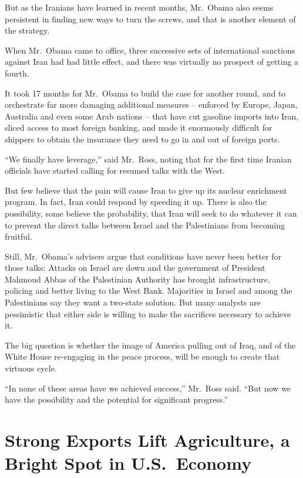 ﻿\documentclass[12pt]{article}
\begin{document}
But as the Iranians have learned in recent months, Mr.~Obama also seems persistent in finding new
ways to turn the screws, and that is another element of the strategy.

When Mr.~Obama came to office, three successive sets of international sanctions against Iran had had
little effect, and there was virtually no prospect of getting a fourth.

It took 17 months for Mr.~Obama to build the case for another round, and to orchestrate far more
damaging additional measures -- enforced by Europe, Japan, Australia and even some Arab nations --
that have cut gasoline imports into Iran, sliced access to most foreign banking, and made it
enormously difficult for shippers to obtain the insurance they need to go in and out of foreign
ports.

``We finally have leverage,'' said Mr.~Ross, noting that for the first time Iranian officials have
started calling for resumed talks with the West.

But few believe that the pain will cause Iran to give up its nuclear enrichment program. In fact,
Iran could respond by speeding it up. There is also the possibility, some believe the probability,
that Iran will seek to do whatever it can to prevent the direct talks between Israel and the
Palestinians from becoming fruitful.

Still, Mr.~Obama's advisers argue that conditions have never been better for those talks: Attacks on
Israel are down and the government of President Mahmoud Abbas of the Palestinian Authority has
brought infrastructure, policing and better living to the West Bank. Majorities in Israel and among
the Palestinians say they want a two-state solution. But many analysts are pessimistic that either
side is willing to make the sacrifices necessary to achieve it.

The big question is whether the image of America pulling out of Iraq, and of the White House
re-engaging in the peace process, will be enough to create that virtuous cycle.

``In none of these areas have we achieved success,'' Mr.~Ross said. ``But now we have the
possibility and the potential for significant progress.''

\pagebreak
\section{Strong Exports Lift Agriculture, a Bright Spot in U.S.~Economy}
\end{document}
